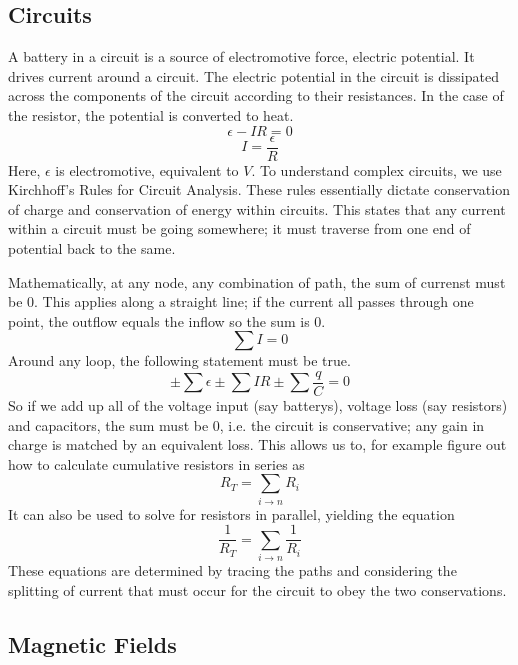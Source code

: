 \documentclass[12pt]{report}
\begin{document}
\begin{flushleft}
\subsection*{Circuits}

A battery in a circuit is a source of electromotive force, electric potential.
It drives current around a circuit. The electric potential in the circuit is
dissipated across the components of the circuit according to their resistances.
In the case of the resistor, the potential is converted to heat.
\[\epsilon - IR = 0\]
\[I = \frac{\epsilon}{R}\]
Here, \(\epsilon\) is electromotive, equivalent to \(V\). To understand complex
circuits, we use Kirchhoff's Rules for Circuit Analysis. These rules 
essentially dictate conservation of charge and conservation of energy within
circuits. This states that any current within a circuit must be going 
somewhere; it must traverse from one end of potential back to the same. \par
Mathematically, at any node, any combination of path, the sum of currenst must
be \(0\). This applies along a straight line; if the current all passes through
one point, the outflow equals the inflow so the sum is \(0\).
\[\sum I = 0\]
Around any loop, the following statement must be true.
\[\pm\sum\epsilon\pm\sum IR\pm\sum\frac{q}{C} = 0\]
So if we add up all of the voltage input (say batterys), voltage loss 
(say resistors) and capacitors, the sum must be \(0\), i.e. the circuit is
conservative; any gain in charge is matched by an equivalent loss. This
allows us to, for example figure out how to calculate cumulative resistors in
series as
\[R_T = \sum_{i\rightarrow n}R_i\]
It can also be used to solve for resistors in parallel, yielding the equation
\[\frac{1}{R_T} = \sum_{i\rightarrow n}\frac{1}{R_i}\]
These equations are determined by tracing the paths and considering the 
splitting of current that must occur for the circuit to obey the two 
conservations.

\subsection*{Magnetic Fields}


\end{flushleft}
\end{document}
